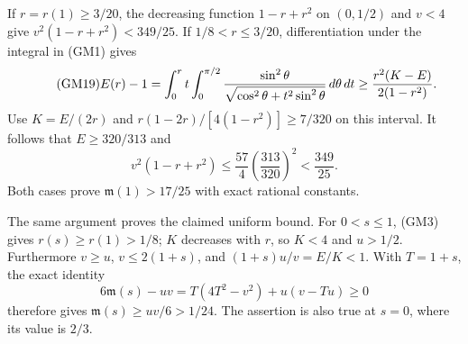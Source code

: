If $r=r(1)\ge3/20$, the decreasing function $1-r+r^2$ on $(0,1/2)$
and $v<4$ give $v^2(1-r+r^2)<349/25$.
If $1/8<r\le3/20$, differentiation under the integral in (GM1) gives
\begin{equation}\tag{GM19}
 E(r)-1=\int_0^r t\int_0^{\pi/2}
 \frac{\sin^2\theta}{\sqrt{\cos^2\theta+t^2\sin^2\theta}}
 \,d\theta\,d t
 \ge\frac{r^2(K-E)}{2(1-r^2)}.
\end{equation}
Use $K=E/(2r)$ and
$r(1-2r)/[4(1-r^2)]\ge7/320$ on this interval.
It follows that $E\ge320/313$ and
\[
 v^2(1-r+r^2)\le\frac{57}{4}\left(\frac{313}{320}\right)^2
 <\frac{349}{25}.
\]
Both cases prove $\mathfrak m(1)>17/25$ with exact rational constants.

The same argument proves the claimed uniform bound. For $0<s\le1$,
(GM3) gives $r(s)\ge r(1)>1/8$; $K$ decreases with $r$, so $K<4$
and $u>1/2$. Furthermore $v\ge u$, $v\le2(1+s)$, and
$(1+s)u/v=E/K<1$. With $T=1+s$, the exact identity
\begin{equation}\tag{GM20}
 6\mathfrak m(s)-uv=T(4T^2-v^2)+u(v-Tu)\ge0
\end{equation}
therefore gives $\mathfrak m(s)\ge uv/6>1/24$. The assertion is also
true at $s=0$, where its value is $2/3$.


